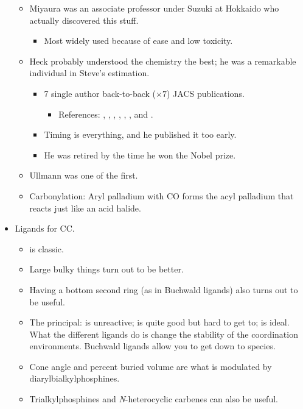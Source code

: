 \documentclass[../notes.tex]{subfiles}
\begin{document}
\begin{itemize}
\begin{itemize}
        \item Miyaura was an associate professor under Suzuki at Hokkaido who actually discovered this stuff.
        \begin{itemize}
            \item Most widely used because of ease and low toxicity.
        \end{itemize}
        \item Heck probably understood the chemistry the best; he was a remarkable individual in Steve's estimation.
        \begin{itemize}
            \item 7 single author back-to-back ($\times 7$) JACS publications.
            \begin{itemize}
                \item References: \textcite{bib:Heck1}, \textcite{bib:Heck2}, \textcite{bib:Heck3}, \textcite{bib:Heck4}, \textcite{bib:Heck5}, \textcite{bib:Heck6}, and \textcite{bib:Heck7}.
            \end{itemize}
            \item Timing is everything, and he published it too early.
            \item He was retired by the time he won the Nobel prize.
        \end{itemize}
        \item Ullmann was one of the first.
        \item Carbonylation: Aryl palladium with CO forms the acyl palladium that reacts just like an acid halide.
    \end{itemize}
    \item Ligands for CC.
    \begin{itemize}
        \item {} is classic.
        \item Large bulky things turn out to be better.
        \item Having a bottom second ring (as in Buchwald ligands) also turns out to be useful.
        \item The principal:  is unreactive;  is quite good but hard to get to;  is ideal. What the different ligands do is change the stability of the coordination environments. Buchwald ligands allow you to get down to  species.
        \item Cone angle and percent buried volume are what is modulated by diarylbialkylphosphines.
        \item Trialkylphosphines and \emph{N}-heterocyclic carbenes can also be useful.

\end{itemize}
\end{itemize}
\end{document}
